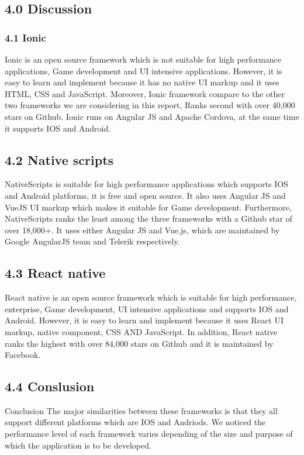 \documentclass[12pt]{extreport}
\begin{document}
\newpage
\subsection*{4.0 Discussion}
\subsubsection*{4.1 Ionic} 
Ionic is an open source framework which is not suitable for high performance applications, Game development and UI intensive applications. However, it is easy to learn and implement because it has no native UI markup and it uses HTML, CSS and JavaScript.
Moreover, Ionic framework compare to the other two frameworks we are considering in this report, Ranks second with over 40,000 stars on Github. Ionic runs on Angular JS and Apache Cordova, at the same time it supports IOS and Android.
\subsection*{4.2 Native scripts}
NativeScripts is suitable for high performance applications which supports IOS and Android platforms, it is free and open source. It also uses Angular JS and VueJS UI markup which makes it suitable for Game development.
Furthermore, NativeScripts ranks the least among the three frameworks with a Github star of over 18,000+. It uses either Angular JS and Vue.js, which are maintained by Google AngularJS team and Telerik respectively.
\subsection*{4.3 React native} 
React native is an open source framework which is suitable for high performance, enterprise, Game development, UI intensive applications and supports IOS and Android. However, it is easy to learn and implement because it uses React UI markup, native component, CSS AND JavaScript.
In addition, React native ranks the highest with over 84,000 stars on Github and it is maintained by Facebook.

\subsection*{4.4 Conslusion}
Conclusion
The major similarities between these frameworks is that they all support different platforms which are IOS and Andriods. We noticed the performance level of each framework varies depending of the size and purpose of which the application is to be developed. 
\end{document}

